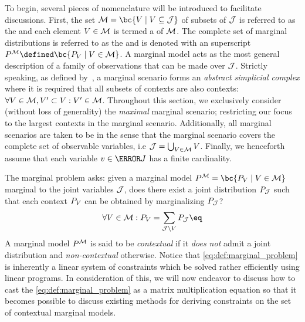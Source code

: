 \documentclass[aps, 10pt, english, twoside, pra, nofootinbib, tightenlines, longbibliography, superscriptaddress]{revtex4-1}
\begin{document}
    To begin, several pieces of nomenclature will be introduced to facilitate discussions. First, the set $\mscenario = \bc{V \mid V \subseteq \jointvar}$ of subsets of $\mathcal{J}$ is referred to as the  and each element $V \in \mathcal{M}$ is termed a  of $\mathcal{M}$. The complete set of marginal distributions is referred to as the  and is denoted with an superscript $\prob^{\mscenario} \defined \bc{\prob[V] \mid V \in \mscenario}$. A marginal model acts as the most general description of a family of observations that can be made over $\mathcal{J}$. Strictly speaking, as defined by~\cite{Fritz_2011}, a marginal scenario forms an \textit{abstract simplicial complex} where it is required that all subsets of contexts are also contexts: $\forall V \in \mathcal{M}, V' \subset V : V' \in \mathcal{M}$. Throughout this section, we exclusively consider (without loss of generality) the \textit{maximal} marginal scenario; restricting our focus to the largest contexts in the marginal scenario. Additionally, all marginal scenarios are taken to be  in the sense that the marginal scenario covers the complete set of observable variables, i.e $\mathcal{J} = \bigcup_{V \in \mathcal{M}} V$. Finally, we henceforth assume that each variable $v \in \s J$ has a finite cardinality.

    The marginal problem asks: given a marginal model $\prob^{\mscenario} = \bc{\prob[V] \mid V \in \mscenario}$ marginal to the joint variables $\mathcal{J}$, does there exist a joint distribution $\prob[\jointvar]$ such that each context $\prob[V]$ can be obtained by marginalizing $\prob[\jointvar]$?
    \[ \forall V \in \mscenario : \prob[V] = \sum_{\jointvar \setminus V} \prob[\jointvar] \eq \label{eq:def:marginal_problem}\]
    A marginal model $\prob^{\mscenario}$ is said to be \textit{contextual} if it \textit{does not} admit a joint distribution and \textit{non-contextual} otherwise. Notice that \cref{eq:def:marginal_problem} is inherently a linear system of constraints which be solved rather efficiently using linear programs. In consideration of this, we will now endeavor to discuss how to cast the \cref{eq:def:marginal_problem} as a matrix multiplication equation so that it becomes possible to discuss existing methods for deriving constraints on the set of contextual marginal models.
\end{document}
